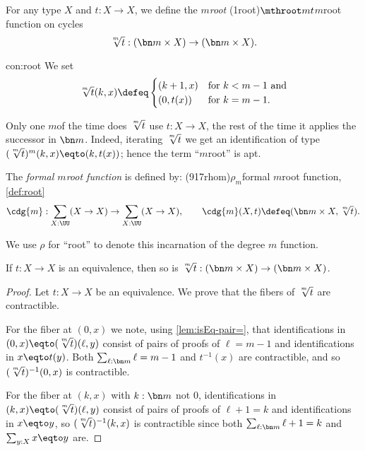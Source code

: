\begin{construction}\label{con:root}
  For any type $X$ and $t:X\to X$, we define the $m$\th \emph{root}%
  \glossary(1root){$\protect\mthroot mt$}{$m$\th root function on cycles}
 \[
    {\textstyle\sqrt[\uproot{2}m]t} : (\bn m\times X) \to (\bn m\times X).
  \]
\end{construction}
\begin{implementation}{con:root}
  We set
  \[
    {\textstyle\sqrt[\uproot{2}m]t}(k,x)\defeq
    \begin{cases}
      (k+1,x)& \text{for $k<m-1$ and}\\
      (0,t(x))& \text{for $k=m-1$}.
    \end{cases}
  \]
\par \vspace{-1.5\baselineskip}
\qedhere
\end{implementation}
Only one $m$\th of the time does $\sqrt[\uproot{2}m]t$ use $t:X\to X$,
the rest of the time it applies the successor in $\bn m$.
Indeed, iterating $\sqrt[\uproot{2}m]t$
we get an identification of type $(\sqrt[\uproot{2}m]t)^m(k,x)\eqto(k,t(x))$;
hence the term ``$m$\th root'' is apt.

\begin{definition}\label{def:root}
  The \emph{formal $m$\th root function} is defined by:
  \glossary(917rhom){$\rho_m$}{formal $m$\th root function, \cref{def:root}}
  \[
    \cdg{m}:\sum_{X:\UU}(X\to X)\to\sum_{X:\UU}(X\to X),\qquad
    \cdg{m}(X,t)\defeq(\bn m\times X,{\textstyle\sqrt[\uproot{2}m]t}).\qedhere
  \]
\end{definition}
\noindent We use $\rho$ for ``root'' to denote this incarnation
of the degree $m$ function.

\begin{lemma}\label{lem:root-pres-equiv}
  If $t:X\to X$ is an equivalence,
  then so is $\sqrt[\uproot{2}m]t : (\bn m\times X) \to (\bn m\times X)$.
\end{lemma}
\begin{proof}
  Let $t:X\to X$ be an equivalence. We prove that the fibers of
  $\sqrt[\uproot{2}m]t$ are contractible.

  For the fiber at $(0,x)$ we note,
  using \cref{lem:isEq-pair=}, that identifications in
  $(0,x)\eqto(\sqrt[\uproot{2}m]t)(\ell,y)$ consist of pairs of proofs
  of  $\ell=m-1$ and identifications in $x\eqto t(y)$.
  Both $\sum_{\ell:\bn m}\ell=m-1$ and $t^{-1}(x)$ are contractible,
  and so $(\sqrt[\uproot{2}m]t)^{-1}(0,x)$ is contractible.

  For the fiber at $(k,x)$ with $k:\bn m$ not $0$,
  identifications in $(k,x)\eqto(\sqrt[\uproot{2}m]t)(\ell,y)$
  consist of pairs of proofs of $\ell+1=k$ and identifications in $x\eqto y$,
  so $(\sqrt[\uproot{2}m]t)^{-1}(k,x)$ is contractible since both
  $\sum_{\ell:\bn m}\ell+1=k$ and $\sum_{y:X}x\eqto y$ are.
\end{proof}

